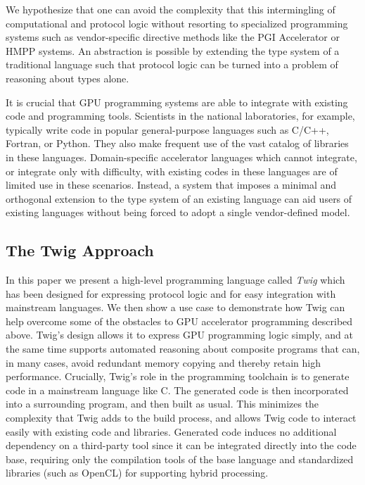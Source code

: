 We hypothesize that one can avoid the complexity that this intermingling of
computational and protocol logic without resorting to specialized programming
systems such as vendor-specific directive methods like the PGI
Accelerator\cite{pgi-accelerate} or HMPP\cite{hmpp} systems. An abstraction is
possible by extending the type system of a traditional language such that
protocol logic can be turned into a problem of reasoning about types alone.

It is crucial that GPU programming systems are able to integrate with existing
code and programming tools. Scientists in the national laboratories, for
example, typically write code in popular general-purpose languages such as
C/C++, Fortran, or Python. They also make frequent use of the vast catalog of
libraries in these languages. Domain-specific accelerator languages which cannot
integrate, or integrate only with difficulty, with existing codes in these
languages are of limited use in these scenarios. Instead, a system that imposes
a minimal and orthogonal extension to the type system of an existing language
can aid users of existing languages without being forced to adopt a single
vendor-defined model.

\vfill
\pagebreak
\subsection{The Twig Approach}

In this paper we present a high-level programming language called \emph{Twig}
which has been designed for expressing protocol logic and for easy integration
with mainstream languages. We then show a use case to demonstrate how Twig can
help overcome some of the obstacles to GPU accelerator programming described
above. Twig's design allows it to express GPU programming logic simply, and at
the same time supports automated reasoning about composite programs that can, in
many cases, avoid redundant memory copying and thereby retain high performance.
Crucially, Twig's role in the programming toolchain is to generate code in a
mainstream language like C. The generated code is then incorporated into a
surrounding program, and then built as usual. This minimizes the complexity that
Twig adds to the build process, and allows Twig code to interact easily with
existing code and libraries. Generated code induces no additional dependency on
a third-party tool since it can be integrated directly into the code base,
requiring only the compilation tools of the base language and standardized
libraries (such as OpenCL) for supporting hybrid processing.

